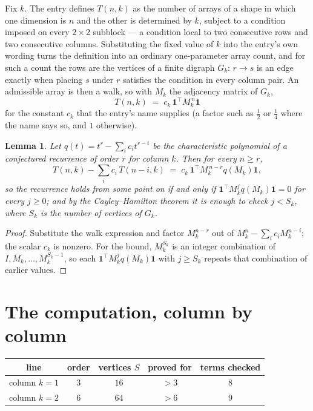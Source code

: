 \documentclass[11pt,a4paper]{article}
\theoremstyle{plain}
\newtheorem{lemma}[theorem]{Lemma}
\theoremstyle{definition}
\begin{document}
Fix $k$. The entry defines $T(n,k)$ as the number of arrays of a shape in which one dimension
is $n$ and the other is determined by $k$, subject to a condition imposed on every
$2\times2$ subblock --- a condition local to two consecutive rows and two consecutive columns.
Substituting the fixed value of $k$ into the entry's own wording turns the definition into an
ordinary one-parameter array count, and for such a count the rows are the vertices of a finite
digraph $G_k$: $r\to s$ is an edge exactly when placing $s$ under $r$ satisfies the condition
in every column pair. An admissible array is then a walk, so with $M_k$ the adjacency matrix
of $G_k$,
\[
T(n,k)\;=\;c_k\,\mathbf{1}^{\!\top}M_k^{\,n}\mathbf{1}
\]
for the constant $c_k$ that the entry's name supplies (a factor such as $\tfrac12$ or
$\tfrac14$ where the name says so, and $1$ otherwise).

\begin{lemma}\label{lem:crit}
Let $q(t)=t^{r}-\sum_i c_it^{r-i}$ be the characteristic polynomial of a conjectured
recurrence of order $r$ for column $k$. Then for every $n\ge r$,
\[
T(n,k)-\sum_i c_i\,T(n-i,k)\;=\;c_k\,\mathbf{1}^{\!\top}M_k^{\,n-r}q(M_k)\mathbf{1},
\]
so the recurrence holds from some point on if and only if
$\mathbf{1}^{\!\top}M_k^{j}q(M_k)\mathbf{1}=0$ for every $j\ge0$; and by the
Cayley--Hamilton theorem it is enough to check $j<S_k$, where $S_k$ is the number of vertices
of $G_k$.
\end{lemma}

\begin{proof}
Substitute the walk expression and factor $M_k^{n-r}$ out of $M_k^{n}-\sum_ic_iM_k^{n-i}$;
the scalar $c_k$ is nonzero. For the bound, $M_k^{S_k}$ is an integer combination of
$I,M_k,\dots,M_k^{S_k-1}$, so each $\mathbf{1}^{\!\top}M_k^{j}q(M_k)\mathbf{1}$ with
$j\ge S_k$ repeats that combination of earlier values.
\end{proof}

\section{The computation, column by column}

\begin{center}
\begin{tabular}{ccccc}
line & order & vertices $S$ & proved for & terms checked \\ \hline
column $k$$=1$ & $3$ & $16$ & $>3$ & $8$ \\
column $k$$=2$ & $6$ & $64$ & $>6$ & $9$ \\
\end{tabular}
\end{center}
\end{document}
